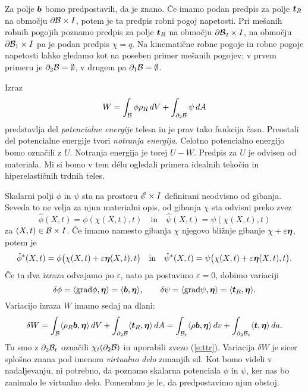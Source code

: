 Za polje $\boldsymbol b$ bomo predpostavili, da je znano.
Če imamo podan predpis za polje $\boldsymbol t_R$ na območju $\partial\mathcal B\times I$, potem je ta predpis
robni pogoj napetosti. Pri mešanih robnih pogojih poznamo predpis za polje $\boldsymbol t_R$ na
območju $\partial\mathcal B_2\times I$, na območju $\partial\mathcal B_1\times I$ pa je podan predpis $\chi=q$.
Na kinematične robne pogoje in robne pogoje napetosti lahko gledamo kot na poseben
primer mešanih pogojev; v prvem primeru je $\partial_2\mathcal B=\emptyset$, v drugem pa
$\partial_1\mathcal B=\emptyset$.

Izraz
\begin{equation*}
	W = \int_{\mathcal B}\phi\rho_R\, dV + \int_{\partial_2 \mathcal B}\psi\, dA
\end{equation*}
predstavlja del \emph{potencialne energije} telesa in je prav tako funkcija časa.
Preostali del potencialne energije tvori \emph{notranja energija}.
Celotno potencialno energijo bomo označili z $U$. Notranja energija je torej $U-W$.
Predpis za $U$ je odvisen od materiala. Mi si bomo v tem délu ogledali primera
idealnih tekočin in hiperelastičnih trdnih teles.

Skalarni polji $\phi$ in $\psi$ sta na prostoru $\mathscr E\times I$ definirani neodvisno od gibanja.
Seveda to ne velja za njun materialni opis, od gibanja $\chi$ sta odvisni preko zvez
\[ \hat{\phi}(X,t)=\phi(\chi(X,t),t)\quad\textrm{in}\quad\hat{\psi}(X,t)=\psi(\chi(X,t),t) \]
za $(X,t)\in \mathcal B\times I$.
Če imamo namesto gibanja $\chi$ njegovo bližnje gibanje $\chi+\varepsilon\boldsymbol \eta$, potem je
\[
	\hat{\phi}^*(X,t)=\phi\big(\chi(X,t)+\varepsilon\boldsymbol \eta(X,t),t\big)\quad\textrm{in}
	\quad\hat{\psi}^*(X,t)=\psi\big(\chi(X,t)+\varepsilon\boldsymbol \eta(X,t),t\big).
\]
Če ta dva izraza odvajamo po $\varepsilon$, nato pa postavimo $\varepsilon=0$, dobimo variaciji
\[
	\delta\phi=\langle\mathrm{grad}\phi,\boldsymbol \eta\rangle=\langle\boldsymbol b,\boldsymbol \eta\rangle,\qquad
	\delta\psi=\langle\mathrm{grad}\psi,\boldsymbol \eta\rangle=\langle\boldsymbol t_R,\boldsymbol \eta\rangle.
\]
Variacijo izraza $W$ imamo sedaj na dlani:
\begin{equation} \label{e:varvide}
	\delta W = \int_{\mathcal B}\langle\rho_R\boldsymbol b,\boldsymbol \eta\rangle\, dV
	+ \int_{\partial_2 \mathcal B}\langle\boldsymbol t_R,\boldsymbol \eta\rangle\, dA=
	\int_{\mathcal B_t}\langle\rho\boldsymbol b,\boldsymbol \eta\rangle\, dv
	+ \int_{\partial_2 \mathcal B_t}\langle\boldsymbol t,\boldsymbol \eta\rangle\, da.
\end{equation}
Tu smo z $\partial_2 \mathcal B_t$ označili $\chi_t(\partial_2 \mathcal B)$ in uporabili zvezo (\ref{e:ttr}).
Variacija $\delta W$ je sicer splošno znana
pod imenom \emph{virtualno delo} zunanjih sil. Kot bomo videli v nadaljevanju,
ni potrebno, da poznamo skalarna potenciala $\phi$ in $\psi$, ker nas bo zanimalo le virtualno delo.
Pomembno je le, da predpostavimo njun obstoj.



